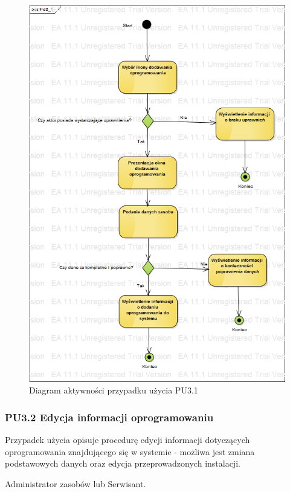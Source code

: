 \begin{figure}[h!]
	\centering
	\includegraphics[scale=0.6]{img/diagrams/activityDiagrams/PU3_1}
	\caption{Diagram aktywności przypadku użycia PU3.1 \label{fig:labelADPU3.1}}
\end{figure}

\subsubsection{PU3.2 Edycja informacji oprogramowaniu}

Przypadek użycia opisuje procedurę edycji informacji dotyczących oprogramowania znajdującego się w systemie - możliwa jest zmiana podstawowych danych oraz edycja przeprowadzonych instalacji.

Administrator zasobów lub Serwisant.

